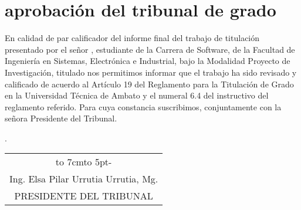 \chapter*{aprobación del tribunal de grado}
En calidad de par calificador del informe final del trabajo de titulación presentado por el señor \autor, estudiante de la Carrera de Software,
de la Facultad de Ingeniería en Sistemas,
Electrónica e Industrial, bajo la Modalidad Proyecto de Investigación, titulado
	{\MakeUppercase\tema}
nos permitimos informar que el trabajo ha sido revisado
y calificado de acuerdo al Artículo 19 del Reglamento para la Titulación de Grado en
la Universidad Técnica de Ambato y el numeral 6.4 del instructivo del reglamento
referido. Para cuya constancia suscribimos, conjuntamente con la señora Presidente
del Tribunal.
\begin{flushright}
	\lugarFechaPrelims.
\end{flushright}


\vspace*{4cm}
\begin{center}
	\begin{tabular}{c}
		\hbox to 7cm{\leaders\hbox to 5pt{\hss - \hss}\hfil} \\
		Ing. Elsa Pilar Urrutia Urrutia, Mg.                 \\
		PRESIDENTE DEL TRIBUNAL                              \\
	\end{tabular}
\end{center}
\vspace*{20mm}
